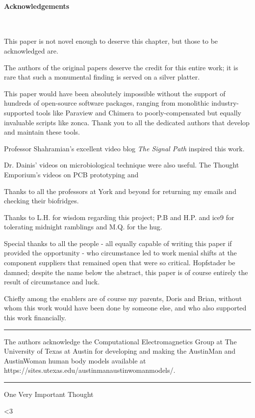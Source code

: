
\clearpage
\paragraph{Acknowledgements}\

This paper is not novel enough to deserve this chapter, but those to be acknowledged are.

The authors of the original papers deserve the credit for this entire work;  it is rare that such a monumental finding is served on a silver platter.

This paper would have been absolutely impossible without the support of hundreds of open-source software packages, ranging from monolithic industry-supported tools like Paraview and Chimera to poorly-compensated but equally invaluable scripts like zonca. Thank you to all the dedicated authors that develop and maintain these tools.

Professor Shahramian's excellent video blog {\it The Signal Path} inspired this work. 

Dr. Dainis' videos on microbiological technique were also useful. The Thought Emporium's videos on PCB prototyping and 

Thanks to all the professors at York and beyond for returning my emails and checking their biofridges.

Thanks to L.H. for wisdom regarding this project; P.B and H.P. and ice9 for tolerating midnight ramblings and M.Q. for the hug.

Special thanks to all the people - all equally capable of writing this paper if provided the opportunity - who circumstance led to work menial shifts at the component suppliers that remained open that were so critical. Hopfstader be damned; despite the name below the abstract, this paper is of course entirely the result of circumstance and luck. 

Chiefly among the enablers are of course my parents, Doris and Brian, without whom this work would have been done by someone else, and who also supported this work financially. 


\rule{\linewidth}{0.2pt}

The authors acknowledge the Computational Electromagnetics Group at The University of Texas at Austin for developing and making the AustinMan and AustinWoman human body models available at https://sites.utexas.edu/austinmanaustinwomanmodels/.

\rule{\linewidth}{0.2pt}

One Very Important Thought



{\Large <3}

